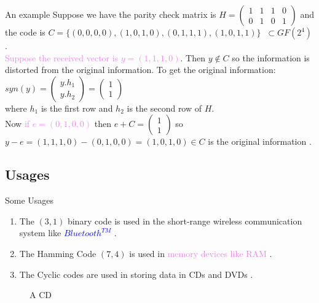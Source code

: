 \documentclass{beamer}
\begin{document}
\begin{frame}{An example}
Suppose we have the parity check matrix is \(H=\begin{pmatrix}
    1 & 1 & 1 & 0\\
    0 & 1 & 0 & 1
  \end{pmatrix}\) and the code is   \(C=\{(0,0,0,0),(1,0,1,0),(0,1,1,1),(1,0,1,1)\} \;\; \subset GF(2^{4})\).\\[5mm]

  \textcolor{violet}{Suppose the received vector is \(y=(1,1,1,0)\)}. Then \(y \not \in C\) so the information is distorted from the original information. To get the original information:\\
  \(syn(y)= \begin{pmatrix}
    y.h_1 \\ y.h_2
  \end{pmatrix} = \begin{pmatrix}
    1 \\ 1
  \end{pmatrix}\) \\
  where \(h_1\) is the first row and \(h_2\) is the second row of \(H\).\\[5mm]
  Now \textcolor{violet}{if \(e=(0,1,0,0)\)} then \(e+C=\begin{pmatrix}
    1 \\ 1
  \end{pmatrix}\) so \(y-e=(1,1,1,0)-(0,1,0,0)=(1,0,1,0) \in C\) is the original information \cite{error_correct}.
\end{frame}
\subsection{Usages}
\begin{frame}{Some Usages}
  \vspace{3mm}

  \begin{enumerate}
  \item The \((3,1)\) binary code is used in the short-range wireless communication system like \textcolor{blue}{\(Bluetooth^{TM}\)} \cite{wireless}.

    \vspace{3mm}
  \item The Hamming Code \((7,4)\) is used in \textcolor{violet}{memory devices like RAM} \cite{coding}.

\vspace{3mm}
  \item The Cyclic codes are used in storing data in \textcolor{green!50!black}{CDs and DVDs} \cite{coding}.
  \end{enumerate}
  \begin{figure}[h]

    \centering
    \caption{\footnotesize A CD}
    \end{figure}
\end{frame}
\end{document}
